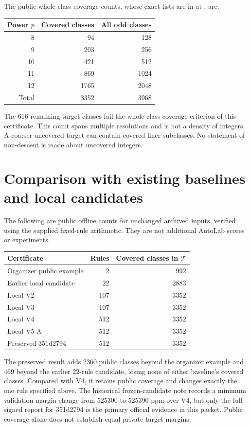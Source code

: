 \documentclass[10pt]{article}
\newcommand{\file}[1]{\path{#1}}
\begin{document}
The public whole-class coverage counts, whose exact lists are in \file{local-check.json} at \file{public_classes}, are:
\begin{center}
\begin{tabular}{rrr}
\toprule
Power $p$ & Covered classes & All odd classes\\
\midrule
8 & 94 & 128\\
9 & 203 & 256\\
10 & 421 & 512\\
11 & 869 & 1024\\
12 & 1765 & 2048\\
\midrule
Total & 3352 & 3968\\
\bottomrule
\end{tabular}
\end{center}
The 616 remaining target classes fail the whole-class coverage criterion of this certificate. This count spans multiple resolutions and is not a density of integers. A coarser uncovered target can contain covered finer subclasses. No statement of non-descent is made about uncovered integers.

\section{Comparison with existing baselines and local candidates}
The following are public offline counts for unchanged archived inputs, verified using the supplied fixed-rule arithmetic. They are not additional AutoLab scores or experiments.
\begin{center}
\begin{tabular}{lrr}
\toprule
Certificate & Rules & Covered classes in $\mathcal T$\\
\midrule
Organizer public example & 2 & 992\\
Earlier local candidate & 22 & 2883\\
Local V2 & 107 & 3352\\
Local V3 & 107 & 3352\\
Local V4 & 512 & 3352\\
Local V5-A & 512 & 3352\\
Preserved 351d2794 & 512 & 3352\\
\bottomrule
\end{tabular}
\end{center}
The preserved result adds 2360 public classes beyond the organizer example and 469 beyond the earlier 22-rule candidate, losing none of either baseline's covered classes. Compared with V4, it retains public coverage and changes exactly the one rule specified above. The historical frozen-candidate note records a minimum validation margin change from 525300 to 525390 ppm over V4, but only the full signed report for 351d2794 is the primary official evidence in this packet. Public coverage alone does not establish equal private-target margins.
\end{document}
